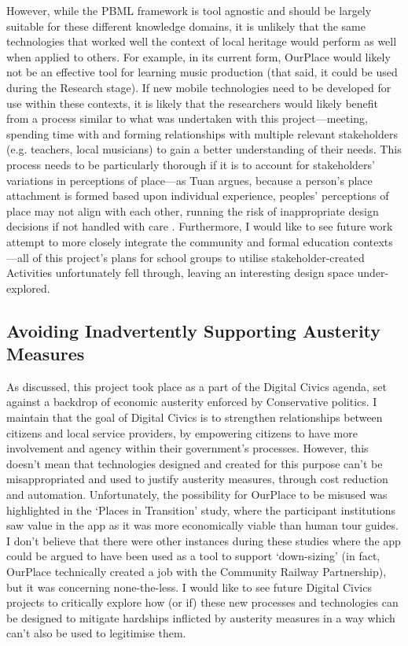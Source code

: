 However, while the PBML framework is tool agnostic and should be largely suitable for these different knowledge domains, it is unlikely that the same technologies that worked well the context of local heritage would perform as well when applied to others. For example, in its current form, OurPlace would likely not be an effective tool for learning music production (that said, it could be used during the Research stage). If new mobile technologies need to be developed for use within these contexts, it is likely that the researchers would likely benefit from a process similar to what was undertaken with this project---meeting, spending time with and forming relationships with multiple relevant stakeholders (e.g. teachers, local musicians) to gain a better understanding of their needs. This process needs to be particularly thorough if it is to account for stakeholders' variations in perceptions of place---as Tuan argues, because a person’s place attachment is formed based upon individual experience, peoples' perceptions of place may not align with each other, running the risk of inappropriate design decisions if not handled with care \citep{Tuan1978}. Furthermore, I would like to see future work attempt to more closely integrate the community and formal education contexts---all of this project's plans for school groups to utilise stakeholder-created Activities unfortunately fell through, leaving an interesting design space under-explored.

\subsection*{Avoiding Inadvertently Supporting Austerity Measures} 

As discussed, this project took place as a part of the Digital Civics agenda, set against a backdrop of economic austerity enforced by Conservative politics. I maintain that the goal of Digital Civics is to strengthen relationships between citizens and local service providers, by empowering citizens to have more involvement and agency within their government’s processes. However, this doesn't mean that technologies designed and created for this purpose can't be misappropriated and used to justify austerity measures, through cost reduction and automation. Unfortunately, the possibility for OurPlace to be misused was highlighted in the `Places in Transition' study, where the participant institutions saw value in the app as it was more economically viable than human tour guides. I don't believe that there were other instances during these studies where the app could be argued to have been used as a tool to support `down-sizing' (in fact, OurPlace technically created a job with the Community Railway Partnership), but it was concerning none-the-less. I would like to see future Digital Civics projects to critically explore how (or if) these new processes and technologies can be designed to mitigate hardships inflicted by austerity measures in a way which can't also be used to legitimise them.


